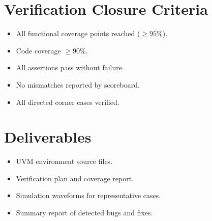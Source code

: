 \documentclass[a4paper,12pt]{article}
\begin{document}
\section{Verification Closure Criteria}

\begin{itemize}
    \item All functional coverage points reached ($\geq 95\%$).
    \item Code coverage $\geq 90\%$.
    \item All assertions pass without failure.
    \item No mismatches reported by scoreboard.
    \item All directed corner cases verified.
\end{itemize}

\section{Deliverables}

\begin{itemize}
    \item UVM environment source files.
    \item Verification plan and coverage report.
    \item Simulation waveforms for representative cases.
    \item Summary report of detected bugs and fixes.
\end{itemize}
\end{document}
